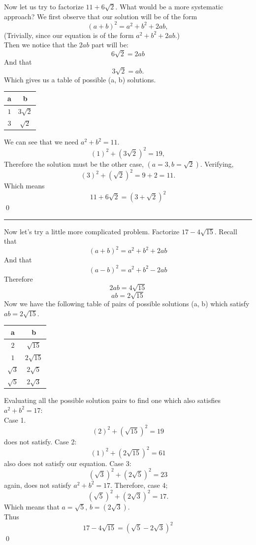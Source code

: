 \documentclass{article}
\begin{document}
Now let us try to factorize $11 + 6\sqrt{2}$.
What would be a more systematic approach?
We first observe that our solution will be of the form
\[
    (a+b)^2 = a^2 + b^2 + 2ab,
\]
(Trivially, since our equation is of the form $a^2 + b^2 + 2ab$.)\\
Then we notice that the $2ab$ part will be:
\[
    6\sqrt{2} = 2ab
\]
And that
\[
    3\sqrt{2} = ab.
\]
Which gives us a table of possible (a, b) solutions.
\begin{center}
    \begin{tabular}{c|c}
        a & b \\
        \hline
        \rule{0pt}{3ex} 
        $1$ & $3\sqrt{2}$ \\ 
        $3$ & $\sqrt{2}$ \\ 
    \end{tabular}
\end{center}
We can see that we need $a^2 + b^2 = 11$.\\
\[
    (1)^2 + (3\sqrt{2})^2 = 19,
\]
Therefore the solution must be the other case, $(a = 3, b = \sqrt{2}).$ Verifying,
\[
    (3)^2 + (\sqrt{2})^2 = 9 + 2 = 11.
\]
Which means 
\[
    11 + 6\sqrt{2} = (3 + \sqrt{2})^2
\] \qed

\vspace{10pt}
\hrule
\vspace{10pt}

Now let's try a little more complicated problem.
Factorize $17-4\sqrt{15}$.
Recall that
\[
    (a + b)^2 = a^2 + b^2 + 2ab
\]
And that
\[
    (a - b)^2 = a^2 + b^2 - 2ab
\]
Therefore
\[
    2ab = 4\sqrt{15}
\]
\[
    ab = 2\sqrt{15}
\]
Now we have the following table of pairs of possible solutions (a, b) which satisfy $ab = 2\sqrt{15}$.
\begin{center}
    \begin{tabular}{c|c}
        a & b \\
        \hline
        \rule{0pt}{3ex} 
        $2$ & $\sqrt{15}$ \\ 
        $1$ & $2\sqrt{15}$ \\ 
        $\sqrt{3}$ & $2\sqrt{5}$ \\ 
        $\sqrt{5}$ & $2\sqrt{3}$ \\ 
    \end{tabular}
\end{center}
Evaluating all the possible solution pairs to find one which also satisfies $a^2 + b^2 = 17$:\\
Case 1.
\[
    (2)^2 + (\sqrt{15})^2 = 19
\]
does not satisfy. Case 2:
\[
    (1)^2 + (2\sqrt{15})^2 = 61
\]
also does not satisfy our equation. Case 3:
\[
    (\sqrt{3})^2 + (2\sqrt{5})^2 = 23
\]
again, does not satisfy $a^2 + b^2 = 17$. Therefore, case 4;
\[
    (\sqrt{5})^2 + (2\sqrt{3})^2 = 17.
\]
Which means that $a = \sqrt{5}$, $b = (2\sqrt{3})$.\\
Thus 
\[
    17-4\sqrt{15} = (\sqrt{5} - 2\sqrt{3})^2
\] \qed
\end{document}
